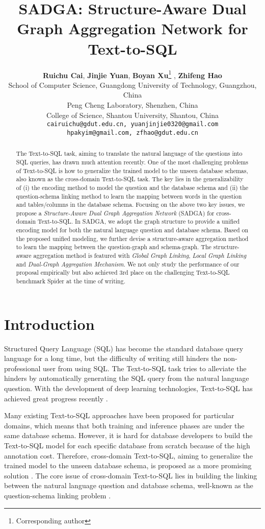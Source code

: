 \documentclass{article}
\title{SADGA: Structure-Aware Dual Graph Aggregation Network for Text-to-SQL}
\author{ 
\textbf{Ruichu Cai}, 
\textbf{Jinjie Yuan}, 
\textbf{Boyan Xu}\thanks{Corresponding author} , 
\textbf{Zhifeng Hao} \\
 School of Computer Science, Guangdong University of Technology, Guangzhou, China\\
 Peng Cheng Laboratory, Shenzhen, China\\
 College of Science, Shantou University, Shantou, China\\
\texttt{cairuichu@gdut.edu.cn, yuanjinjie0320@gmail.com}\\
\texttt{hpakyim@gmail.com, zfhao@gdut.edu.cn}
}
\begin{document}
\maketitle

\begin{abstract}
The Text-to-SQL task, aiming to translate the natural language of the questions into SQL queries, has drawn much attention recently.  One of the most challenging problems of Text-to-SQL is how to generalize the trained model to the unseen database schemas, also known as the cross-domain Text-to-SQL task. The key lies in the generalizability of (i) the encoding method to model the question and the database schema and (ii) the question-schema linking method to learn the mapping between words in the question and tables/columns in the database schema. Focusing on the above two key issues, we propose a \emph{Structure-Aware Dual Graph Aggregation Network} (SADGA) for cross-domain Text-to-SQL. In SADGA, we adopt the graph structure to provide a unified encoding model for both the natural language question and database schema. Based on the proposed unified modeling, we further devise a structure-aware aggregation method to learn the mapping between the question-graph and schema-graph. The structure-aware aggregation method is featured with \emph{Global Graph Linking}, \emph{Local Graph Linking} and \emph{Dual-Graph Aggregation Mechanism}. 
We not only study the performance of our proposal empirically but also achieved 3rd place on the challenging Text-to-SQL benchmark Spider at the time of writing.
\end{abstract}

\section{Introduction}
\label{introduction}
Structured Query Language (SQL) has become the standard database query language for a long time, but the difficulty of writing still hinders the non-professional user from using SQL. The Text-to-SQL task tries to alleviate the hinders by automatically generating the SQL query from the natural language question. With the development of deep learning technologies, Text-to-SQL has achieved great progress recently \citep{cai2017encoder, hwang2019comprehensive, yu2018typesql, xu2017sqlnet}.

Many existing Text-to-SQL approaches have been proposed for particular domains, which means that both training and inference phases are under the same database schema. However, it is hard for database developers to build the Text-to-SQL model for each specific database from scratch because of the high annotation cost. Therefore, cross-domain Text-to-SQL, aiming to generalize the trained model to the unseen database schema, is proposed as a more promising solution \citep{guo2019towards, bogin2019representing, bogin2019global, wang2020rat, chen2021shadowgnn, rubin2021smbop, lin2020bridging, cao-etal-2021-lgesql}. The core issue of cross-domain Text-to-SQL lies in building the linking between the natural language question and database schema, well-known as the question-schema linking problem \citep{guo2019towards, wang2020rat, lin2020bridging, lei2020re, yu2021grappa}.
\end{document}
